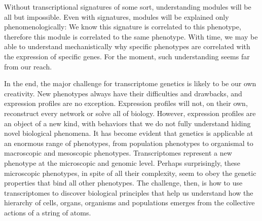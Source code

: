 Without transcriptional signatures of some sort, understanding modules will be
all but impossible. Even with signatures, modules will be explained only
phenomenologically: We know this signature is correlated to this phenotype,
therefore this module is correlated to the same phenotype. With time, we may be
able to understand mechanistically why specific phenotypes are correlated with
the expression of specific genes. For the moment, such understanding seems far
from our reach.

In the end, the major challenge for transcriptome genetics is likely to be our
own creativity. New phenotypes always have their difficulties and drawbacks, and
expression profiles are no exception. Expression profiles will not, on their
own, reconstruct every network or solve all of biology. However, expression
profiles are an object of a new kind, with behaviors that we do not fully
understand hiding novel biological phenomena. It has become evident that
genetics is applicable at an enormous range of phenotypes, from population
phenotypes to organismal to macroscopic and mesoscopic phenotypes.
Transcriptomes represent a new phenotype at the microscopic and genomic level.
Perhaps surprisingly, these microscopic phenotypes, in spite of all their
complexity, seem to obey the genetic properties that bind all other phenotypes.
The challenge, then, is how to use transcriptomes to discover biological
principles that help us understand how the hierarchy of cells, organs, organisms
and populations emerges from the collective actions of a string of atoms.
